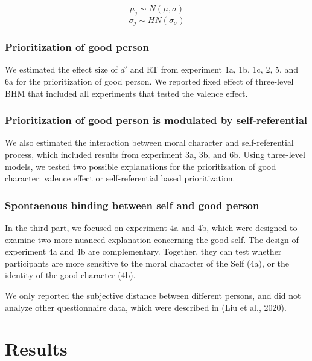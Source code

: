 \documentclass[
  man]{apa6}
\begin{document}
\[\mu_j \sim N(\mu, \sigma)\]
\[\sigma_j \sim HN(\sigma_{\sigma})\]

\hypertarget{prioritization-of-good-person}{%
\subsubsection{Prioritization of good person}\label{prioritization-of-good-person}}

We estimated the effect size of \(d'\) and RT from experiment 1a, 1b, 1c, 2, 5, and 6a for the prioritization of good person. We reported fixed effect of three-level BHM that included all experiments that tested the valence effect.

\hypertarget{prioritization-of-good-person-is-modulated-by-self-referential}{%
\subsubsection{Prioritization of good person is modulated by self-referential}\label{prioritization-of-good-person-is-modulated-by-self-referential}}

We also estimated the interaction between moral character and self-referential process, which included results from experiment 3a, 3b, and 6b. Using three-level models, we tested two possible explanations for the prioritization of good character: valence effect or self-referential based prioritization.

\hypertarget{spontaenous-binding-between-self-and-good-person}{%
\subsubsection{Spontaenous binding between self and good person}\label{spontaenous-binding-between-self-and-good-person}}

In the third part, we focused on experiment 4a and 4b, which were designed to examine two more nuanced explanation concerning the good-self. The design of experiment 4a and 4b are complementary. Together, they can test whether participants are more sensitive to the moral character of the Self (4a), or the identity of the good character (4b).

We only reported the subjective distance between different persons, and did not analyze other questionnaire data, which were described in (Liu et al., 2020).

\hypertarget{results}{%
\section{Results}\label{results}}
\end{document}
